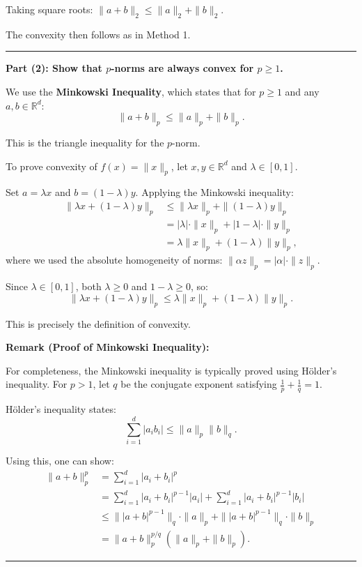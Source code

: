 \documentclass[12pt,letterpaper]{article}
\newenvironment{proof}{\noindent{\bf Proof:}}{\qed\bigskip}
\newcommand{\qed}{\rule{7pt}{7pt}}
\begin{document}
\begin{enumerate}
\begin{proof}
Taking square roots: $\|a + b\|_2 \leq \|a\|_2 + \|b\|_2$.

The convexity then follows as in Method 1.
\end{proof}

\bigskip

\textbf{Part (2): Show that $p$-norms are always convex for $p \geq 1$.}

\begin{proof}
We use the \textbf{Minkowski Inequality}, which states that for $p \geq 1$ and any $a, b \in \mathbb{R}^d$:
\[
\|a + b\|_p \leq \|a\|_p + \|b\|_p.
\]

This is the triangle inequality for the $p$-norm.

\bigskip

To prove convexity of $f(x) = \|x\|_p$, let $x, y \in \mathbb{R}^d$ and $\lambda \in [0,1]$.

Set $a = \lambda x$ and $b = (1-\lambda)y$. Applying the Minkowski inequality:
\begin{align*}
\|\lambda x + (1-\lambda)y\|_p &\leq \|\lambda x\|_p + \|(1-\lambda)y\|_p \\
&= |\lambda| \cdot \|x\|_p + |1-\lambda| \cdot \|y\|_p \\
&= \lambda \|x\|_p + (1-\lambda)\|y\|_p,
\end{align*}
where we used the absolute homogeneity of norms: $\|\alpha z\|_p = |\alpha| \cdot \|z\|_p$.

Since $\lambda \in [0,1]$, both $\lambda \geq 0$ and $1-\lambda \geq 0$, so:
\[
\|\lambda x + (1-\lambda)y\|_p \leq \lambda \|x\|_p + (1-\lambda)\|y\|_p.
\]

This is precisely the definition of convexity.

\bigskip

\textbf{Remark (Proof of Minkowski Inequality):}

For completeness, the Minkowski inequality is typically proved using H\"older's inequality. For $p > 1$, let $q$ be the conjugate exponent satisfying $\frac{1}{p} + \frac{1}{q} = 1$.

H\"older's inequality states:
\[
\sum_{i=1}^{d}|a_i b_i| \leq \|a\|_p \|b\|_q.
\]

Using this, one can show:
\begin{align*}
\|a + b\|_p^p &= \sum_{i=1}^{d}|a_i + b_i|^p \\
&= \sum_{i=1}^{d}|a_i + b_i|^{p-1}|a_i| + \sum_{i=1}^{d}|a_i + b_i|^{p-1}|b_i| \\
&\leq \||a+b|^{p-1}\|_q \cdot \|a\|_p + \||a+b|^{p-1}\|_q \cdot \|b\|_p \\
&= \|a + b\|_p^{p/q}(\|a\|_p + \|b\|_p).
\end{align*}


\end{proof}
\end{enumerate}
\end{document}
